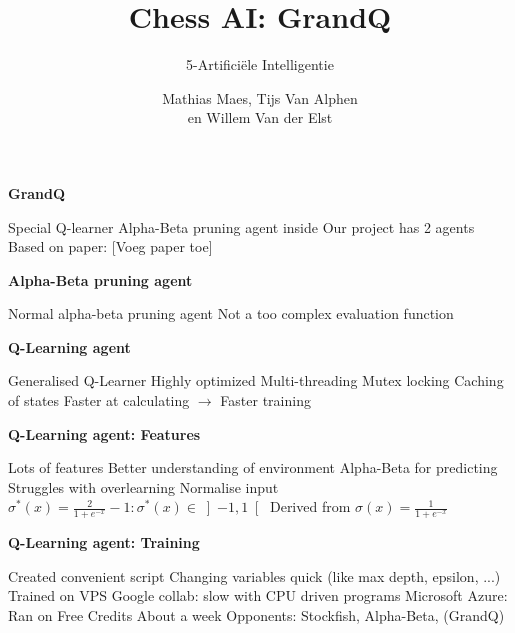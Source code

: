 \documentclass[compress]{beamer}
\title{Chess AI: GrandQ}
\subtitle{5-Artificiële Intelligentie}
\author{Mathias Maes, Tijs Van Alphen\\ en Willem Van der Elst}
\newcommand{\slidetitle}[1]{\textbf{\Large{#1}}\vspace{5mm}}
\begin{document}
\maketitle

\begin{frame}
    \slidetitle{GrandQ}
    \begin{outline}
        \1 Special Q-learner
            \2 Alpha-Beta pruning agent inside
        \1 Our project has 2 agents
        \1 Based on paper: [Voeg paper toe]
    \end{outline}

\end{frame}

\begin{frame}
    \slidetitle{Alpha-Beta pruning agent}

    \begin{outline}
        \1 Normal alpha-beta pruning agent
        \1 Not a too complex evaluation function
    \end{outline}
\end{frame}

\begin{frame}
    \slidetitle{Q-Learning agent}
    \begin{outline}
        \1 Generalised Q-Learner
        \1 Highly optimized
            \2 Multi-threading
                \3 Mutex locking
            \2 Caching of states
        \1 Faster at calculating $\rightarrow$ Faster training
    \end{outline}
\end{frame}

\begin{frame}
    \slidetitle{Q-Learning agent: Features}
    \begin{outline}
        \1 Lots of features
            \2 Better understanding of environment
            \2 Alpha-Beta for predicting
        \1 Struggles with overlearning
            \2 Normalise input
            \2 $\sigma^*(x) = \frac{2}{1 + e^{-x}} -1: \sigma^*(x) \in \left]-1, 1\right[ $ 
            \3 Derived from $\sigma(x) = \frac{1}{1+e^{-x}}$
    \end{outline}
\end{frame}

\begin{frame}
    \slidetitle{Q-Learning agent: Training}

    \begin{outline}
        \1 Created convenient script
            \2 Changing variables quick (like max depth, epsilon, ...)
        \1 Trained on VPS
            \2 Google collab: slow with CPU driven programs
            \2 Microsoft Azure:
                \3 Ran on Free Credits
                \3 About a week
                \1 Opponents: Stockfish, Alpha-Beta, (GrandQ)
    \end{outline}

\end{frame}
\end{document}
